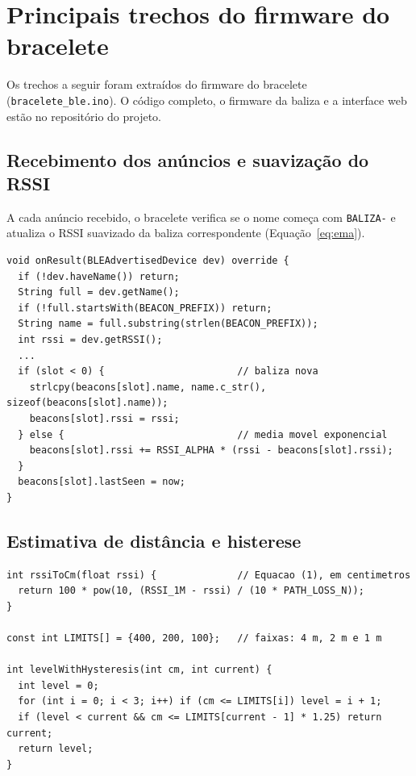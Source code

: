 \chapter{Principais trechos do firmware do bracelete}
\label{ap:codigo}

\lstset{
  basicstyle=\ttfamily\footnotesize,
  columns=fullflexible,
  keepspaces=true,
  frame=single,
  breaklines=true,
  showstringspaces=false,
  language=C++
}

Os trechos a seguir foram extraídos do firmware do bracelete (\texttt{bracelete\_ble.ino}). O código completo, o firmware da baliza e a interface web estão no repositório do projeto.

\section{Recebimento dos anúncios e suavização do RSSI}

A cada anúncio recebido, o bracelete verifica se o nome começa com \texttt{BALIZA-} e atualiza o RSSI suavizado da baliza correspondente (Equação~\ref{eq:ema}).

\begin{lstlisting}
void onResult(BLEAdvertisedDevice dev) override {
  if (!dev.haveName()) return;
  String full = dev.getName();
  if (!full.startsWith(BEACON_PREFIX)) return;
  String name = full.substring(strlen(BEACON_PREFIX));
  int rssi = dev.getRSSI();
  ...
  if (slot < 0) {                       // baliza nova
    strlcpy(beacons[slot].name, name.c_str(), sizeof(beacons[slot].name));
    beacons[slot].rssi = rssi;
  } else {                              // media movel exponencial
    beacons[slot].rssi += RSSI_ALPHA * (rssi - beacons[slot].rssi);
  }
  beacons[slot].lastSeen = now;
}
\end{lstlisting}

\section{Estimativa de distância e histerese}

\begin{lstlisting}
int rssiToCm(float rssi) {              // Equacao (1), em centimetros
  return 100 * pow(10, (RSSI_1M - rssi) / (10 * PATH_LOSS_N));
}

const int LIMITS[] = {400, 200, 100};   // faixas: 4 m, 2 m e 1 m

int levelWithHysteresis(int cm, int current) {
  int level = 0;
  for (int i = 0; i < 3; i++) if (cm <= LIMITS[i]) level = i + 1;
  if (level < current && cm <= LIMITS[current - 1] * 1.25) return current;
  return level;
}
\end{lstlisting}

